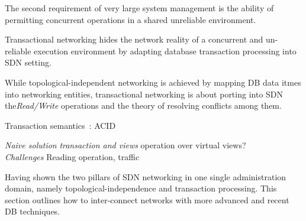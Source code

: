 


The second requirement of very large system management is the ability
of permitting concurrent operations in a shared unreliable
environment. 

Transactional networking hides the network reality of a concurrent and
un-reliable execution environment by adapting database transaction
processing into SDN setting.


While topological\hyp{}independent networking is achieved by mapping
DB data itmes into networking entities, transactional networking is
about porting into SDN the\textit{Read/Write} operations and the
theory of resolving conflicts among them.


\todo



Transaction semantics~\cite{Bernstein:concurrency-recovery}: ACID

\noindent\textit{Naive solution} \textit{transaction and views} operation over virtual
views?\\

\noindent\textit{Challenges} Reading operation, traffic



\label{ssec:integration-integration}

Having shown the two pillars of SDN networking in one single
administration domain, namely topological\hyp{}independence and
transaction processing. This section outlines how to inter-connect
networks with more advanced and recent DB techniques.

